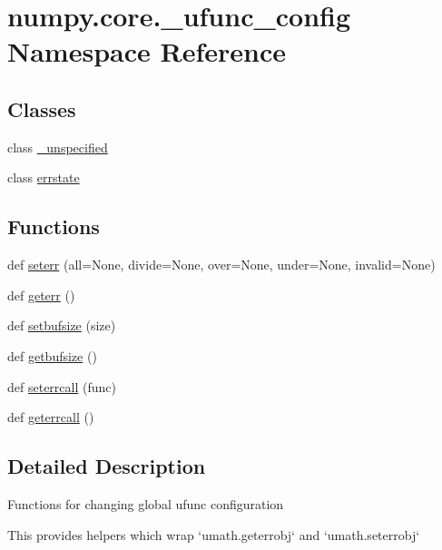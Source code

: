 \hypertarget{namespacenumpy_1_1core_1_1__ufunc__config}{}\section{numpy.\+core.\+\_\+ufunc\+\_\+config Namespace Reference}
\label{namespacenumpy_1_1core_1_1__ufunc__config}
\subsection*{Classes}
\begin{DoxyCompactItemize}
\item 
class \hyperlink{classnumpy_1_1core_1_1__ufunc__config_1_1__unspecified}{\+\_\+unspecified}
\item 
class \hyperlink{classnumpy_1_1core_1_1__ufunc__config_1_1errstate}{errstate}
\end{DoxyCompactItemize}
\subsection*{Functions}
\begin{DoxyCompactItemize}
\item 
def \hyperlink{namespacenumpy_1_1core_1_1__ufunc__config_a4918dbe1e60ec3a552e954dd018b77f1}{seterr} (all=None, divide=None, over=None, under=None, invalid=None)
\item 
def \hyperlink{namespacenumpy_1_1core_1_1__ufunc__config_afcd6f622aa3b9d333e5fd614095c9f06}{geterr} ()
\item 
def \hyperlink{namespacenumpy_1_1core_1_1__ufunc__config_ad64972c5159efdca49ba505081ecb3e0}{setbufsize} (size)
\item 
def \hyperlink{namespacenumpy_1_1core_1_1__ufunc__config_adcdf967493ff6c8180ea677ffd01342e}{getbufsize} ()
\item 
def \hyperlink{namespacenumpy_1_1core_1_1__ufunc__config_acf6a2cd80c820dd631915a45ece44095}{seterrcall} (func)
\item 
def \hyperlink{namespacenumpy_1_1core_1_1__ufunc__config_a0821cf6e03cf8c0ca7c960dd6a4a6bd8}{geterrcall} ()
\end{DoxyCompactItemize}


\subsection{Detailed Description}
\begin{DoxyVerb}Functions for changing global ufunc configuration

This provides helpers which wrap `umath.geterrobj` and `umath.seterrobj`
\end{DoxyVerb}
 

